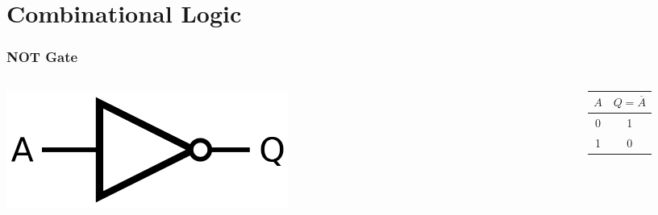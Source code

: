 \documentclass[aspectratio=169, 11pt, handout]{beamer}
\begin{document}
\section{Combinational Logic}
\frame{\sectionpage}


\begin{frame}
  \frametitle{NOT Gate}
\begin{columns}
\begin{column}{0.5\textwidth}
\centering\includegraphics[width=0.5\textwidth]{640px-NOT_ANSI_Labelled.png}
\end{column}
\begin{column}{0.5\textwidth}

\begin{center}
\begin{tabular}{c|c}
\toprule
$A$ & $Q = \overline{A}$\\
\midrule
0 & 1\\
1 & 0\\
\bottomrule
\end{tabular}
\end{center}
\pause
\end{column}
\end{columns}
\end{frame}
\end{document}
